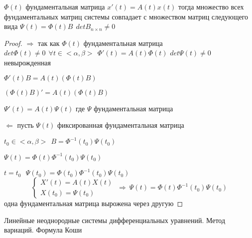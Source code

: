 \begin{theorem}
  $\Phi(t)$ фундаментальная матрица $x'(t) = A(t)x(t)$ тогда множество всех
  фундаментальных матриц системы совпадает с множеством матриц следующего вида
  $\Psi(t) = \Phi(t)B ~~ detB_{n \times n} \not= 0$
\end{theorem}

\begin{proof}
  $\Rightarrow$ так как $\Phi(t)$ фундаментальная матрица $det\Phi(t) \not= 0 ~~
  \forall t \in <\alpha, \beta> ~~ \Phi'(t) = A(t)\Phi(t)$
  $det\Psi(t) \not= 0$ невырожденная

  $\Phi'(t)B = A(t)(\Phi(t)B)$

  $(\Phi(t)B)' = A(t)(\Phi(t)B)$

  $\Psi'(t) = A(t)\Psi(t)$ где $\Psi$ фундаментальная матрица

  $\Leftarrow$ пусть $\Psi(t)$ фиксированная фундаментальная матрица

  $t_0 \in <\alpha, \beta> ~~ B = \Phi^{-1}(t_0) \Psi(t_0)$

  $\Psi(t) = \Phi(t) \Phi^{-1}(t_0) \Psi(t_0)$

  $t = t_0 ~~~ \Psi(t_0) = \Phi(t_0) \Phi^{-1}(t_0) \Psi(t_0)$
  $$
  \left\{
  \begin{array}{l}
    X'(t) = A(t)X(t) \\
    X(t_0) = \Psi(t_0)
  \end{array}
  \right. ~ \Rightarrow ~
  \Psi(t) = \Phi(t) \Phi^{-1}(t_0)\Psi(t_0)
  $$
  одна фундаментальная матрица вырожена через другую
\end{proof}

\begin{title}[\Large]
  Линейные неоднородные системы дифференциальных уравнений. Метод вариаций.
  Формула Коши
\end{title}

